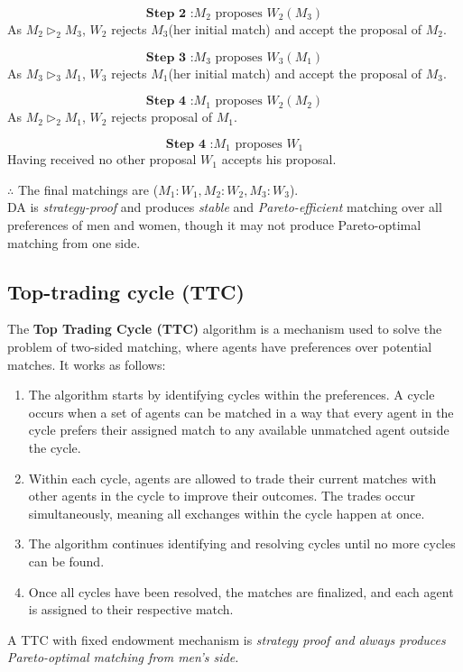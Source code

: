 \documentclass[a4paper,11pt,table]{article}
\newcommand{\rva}{\vartriangleright}
\theoremstyle{definition}
\theoremstyle{remark}
\begin{document}
$$\textbf{Step 2 :} M_2 \text{ proposes }W_2(M_3)$$
As $M_2 \rva_2 M_3$, $W_2$ rejects
$M_3$(her initial match) and accept the proposal of $M_2$.

$$\textbf{Step 3 :} M_3 \text{ proposes }W_3(M_1)$$
As $M_3 \rva_3 M_1$, $W_3$ rejects
$M_1$(her initial match) and accept the proposal of $M_3$.

$$\textbf{Step 4 :} M_1 \text{ proposes }W_2(M_2)$$
As $M_2 \rva_2 M_1$, $W_2$ rejects proposal of $M_1$.

$$\textbf{Step 4 :} M_1 \text{ proposes }W_1$$
Having received no other proposal $W_1$ accepts his proposal.

$\therefore$ The final matchings are ($M_1:W_1, M_2:W_2, M_3:W_3$).\\

DA is \textit{strategy-proof} and produces \textit{stable} and \textit{Pareto-efficient} matching over all preferences of men and women, though it may not produce Pareto-optimal matching from one side.



\subsection{Top-trading cycle (TTC)}

  The \textbf{Top Trading Cycle (TTC)} algorithm is a mechanism used to solve the problem of two-sided matching, where agents have preferences over potential matches. It works as follows:
    \begin{enumerate}
        \item The algorithm starts by identifying cycles within the preferences. A cycle occurs when a set of agents can be matched in a way that every agent in the cycle prefers their assigned match to any available unmatched agent outside the cycle.
        \item Within each cycle, agents are allowed to trade their current matches with other agents in the cycle to improve their outcomes. The trades occur simultaneously, meaning all exchanges within the cycle happen at once.
        \item The algorithm continues identifying and resolving cycles until no more cycles can be found.
        \item Once all cycles have been resolved, the matches are finalized, and each agent is assigned to their respective match.
    \end{enumerate}
    A TTC with fixed endowment mechanism is \textit{strategy proof and always produces Pareto-optimal matching from men's side.}
\end{document}
